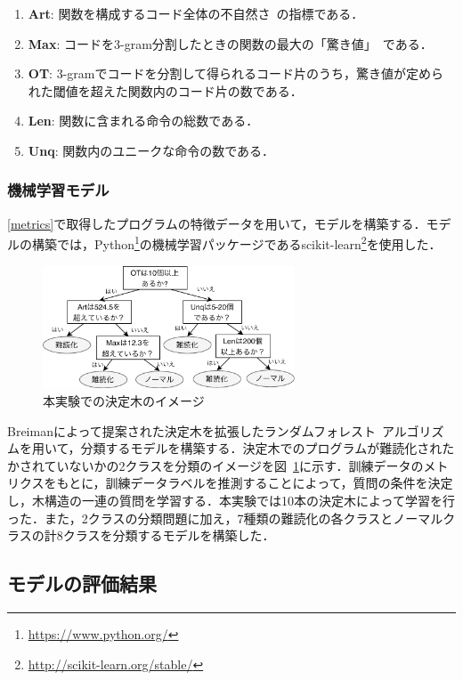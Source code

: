 \documentclass[twocolumn,11pt]{jsarticle}
\begin{document}
\begin{enumerate}
  \item \textbf{Art}: 関数を構成するコード全体の不自然さ~\cite{code-art}の指標である．
  \item \textbf{Max}: コードを3-gram分割したときの関数の最大の「驚き値」~\cite{pinpoint}である．
  \item \textbf{OT}: 3-gramでコードを分割して得られるコード片のうち，驚き値が定められた閾値を超えた関数内のコード片の数である．
  \item \textbf{Len}: 関数に含まれる命令の総数である．
  \item \textbf{Unq}: 関数内のユニークな命令の数である．
\end{enumerate}

\subsubsection{機械学習モデル} \label{model}
\ref{metrics}で取得したプログラムの特徴データを用いて，モデルを構築する．モデルの構築では，Python\footnote{\url{https://www.python.org/}}の機械学習パッケージであるscikit-learn\footnote{\url{http://scikit-learn.org/stable/}}を使用した．

\begin{figure}[!b]
 \centering
 \includegraphics[width=7.5cm]{DT.pdf}
 \caption{本実験での決定木のイメージ}
 \label{fig:DT}
\end{figure}

Breimanによって提案された決定木を拡張したランダムフォレスト~\cite{RF}アルゴリズムを用いて，分類するモデルを構築する．決定木でのプログラムが難読化されたかされていないかの2クラスを分類のイメージを図~\ref{fig:DT}に示す．訓練データのメトリクスをもとに，訓練データラベルを推測することによって，質問の条件を決定し，木構造の一連の質問を学習する．本実験では10本の決定木によって学習を行った．また，2クラスの分類問題に加え，7種類の難読化の各クラスとノーマルクラスの計8クラスを分類するモデルを構築した．

\subsection{モデルの評価結果}
\end{document}
